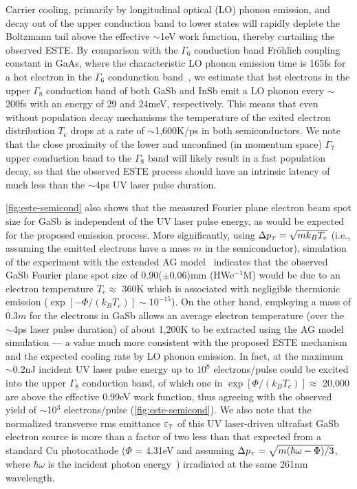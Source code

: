 Carrier cooling, primarily by longitudinal optical (LO) phonon emission, and decay out of the upper conduction band to lower states will rapidly deplete the Boltzmann tail above the effective $\sim$1eV work function, thereby curtailing the observed ESTE.
By comparison with the $\Gamma_6$ conduction band Fr\"ohlich coupling constant in GaAs, where the characteristic LO phonon emission time is 165fs for a hot electron in the $\Gamma_6$ condunction band~\cite{kash_subpicosecond_1985}, we estimate that hot electrons in the upper $\Gamma_8$ conduction band of both GaSb and InSb emit a LO phonon every $\sim$200fs with an energy of 29 and 24meV, respectively.
This means that even without population decay mechanisms the temperature of the exited electron distribution $T_e$ drops at a rate of $\sim$1,600K/ps in both semiconductors.
We note that the close proximity of the lower and unconfined (in momentum space) $\Gamma_7$ upper conduction band to the $\Gamma_8$ band will likely result in a fast population decay, so that the observed ESTE process should have an intrinsic latency of much less than the $\sim$4ps UV laser pulse duration.

\ref{fig:este-semicond} also shows that the measured Fourier plane electron beam spot size for GaSb is independent of the UV laser pulse energy, as would be expected for the proposed emission process.
More significantly, using $\Delta p_{{\scriptscriptstyle T}} = \sqrt{m k_B T_e}$ (i.e., assuming the emitted electrons have a mass $m$ in the semiconductor), simulation of the experiment with the extended AG model~\cite{berger_semi-analytic_2010} indicates that the observed GaSb Fourier plane spot size of 0.90($\pm$0.06)mm (HWe$^{-1}$M) would be due to an electron temperature $T_e \approx$ 360K which is associated with negligible thermionic emission ($\exp[-\Phi/(k_B T_e)] \sim 10^{-15}$).
On the other hand, employing a mass of 0.3$m$ for the electrons in GaSb allows an average electron temperature (over the $\sim$4ps laser pulse duration) of about 1,200K to be extracted using the AG model simulation --- a value much more consistent with the proposed ESTE mechanism and the expected cooling rate by LO phonon emission.
In fact, at the maximum $\sim$0.2nJ incident UV laser pulse energy up to $10^8$ electrons/pulse could be excited into the upper $\Gamma_8$ conduction band, of which one in $\exp[\Phi/(k_B T_e)] \approx$ 20,000 are above the effective 0.99eV work function, thus agreeing with the observed yield of $\sim$10$^3$ electrons/pulse (\ref{fig:este-semicond}).
We also note that the normalized transverse rms emittance $\varepsilon_{{\scriptscriptstyle T}}$ of this UV laser-driven ultrafast GaSb electron source is more than a factor of two less than that expected from a standard Cu photocathode ($\Phi$ = 4.31eV and assuming $\Delta p_{{\scriptscriptstyle T}} = \sqrt{m ( \hbar \omega - \Phi ) / 3 }$, where $\hbar \omega$ is the incident photon energy~\cite{dowell_quantum_2009,jensen_emittance_2010}) irradiated at the same 261nm wavelength.


